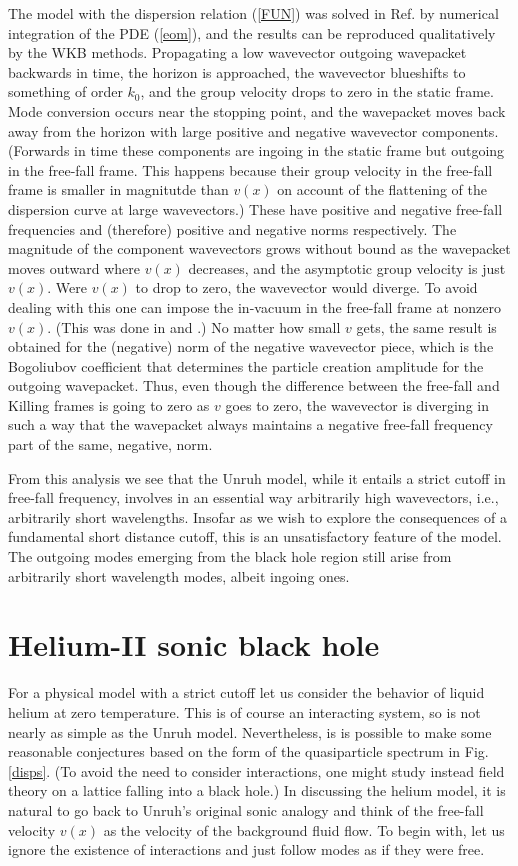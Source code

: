 The model with the dispersion relation (\ref{FUN}) was solved in Ref.
\cite{Unruh2} by numerical integration of the PDE (\ref{eom}), and the
results can be reproduced qualitatively by the WKB methods. Propagating
a low wavevector outgoing wavepacket backwards in time, the horizon is
approached, the wavevector blueshifts to something of order $k_0$, and
the group velocity drops to zero in the static frame.  Mode conversion
occurs near the stopping point\cite{Jaco-mex,CorlJaco}, and the
wavepacket moves back away from the horizon with large positive and
negative wavevector components. (Forwards in time these components are
ingoing in the static frame but outgoing in the free-fall frame. This
happens because their group velocity in the free-fall frame is smaller
in magnitutde than $v(x)$ on account of the flattening of the
dispersion curve at large wavevectors.) These have positive and
negative free-fall frequencies and (therefore) positive and negative
norms respectively.  The magnitude of the component wavevectors grows
without bound as the wavepacket moves outward where $v(x)$ decreases,
and the asymptotic group velocity is just $v(x)$.  Were $v(x)$ to drop
to zero, the wavevector would diverge.  To avoid dealing with this one
can impose the in-vacuum in the free-fall frame at nonzero $v(x)$.
(This was done in \cite{Unruh2} and \cite{CorlJaco}.) No matter how
small $v$ gets, the same result is obtained for the (negative) norm of
the negative wavevector piece, which is the Bogoliubov coefficient that
determines the particle creation amplitude for the outgoing
wavepacket.  Thus, even though the difference between the free-fall and
Killing frames is going to zero as $v$ goes to zero, the wavevector is
diverging in such a way that the wavepacket always maintains a negative
free-fall frequency part of the same, negative, norm.

{}From this analysis we see that the Unruh model, while it entails a
strict cutoff in free-fall frequency, involves in an essential way
arbitrarily high wavevectors, i.e., arbitrarily short wavelengths.
Insofar as we wish to explore the consequences of a fundamental short
distance cutoff, this is an unsatisfactory feature of the model. The
outgoing modes emerging from the black hole region still arise from
arbitrarily short wavelength modes, albeit ingoing ones.

\section{Helium-II sonic black hole} 
For a physical model with a strict
cutoff let us consider the behavior of liquid helium at zero
temperature. This is of course an interacting system, so is not nearly
as simple as the Unruh model. Nevertheless, is is possible to make some
reasonable conjectures based on the form of the quasiparticle spectrum
in Fig. \ref{disps}.  (To avoid the need to consider interactions, one
might study instead field theory on a lattice falling into a black
hole.) In discussing the helium model, it is natural to go back to
Unruh's original sonic analogy and think of the free-fall velocity
$v(x)$  as the velocity of the background fluid flow. To begin with,
let us ignore the existence of interactions and just follow modes as if
they were free.

